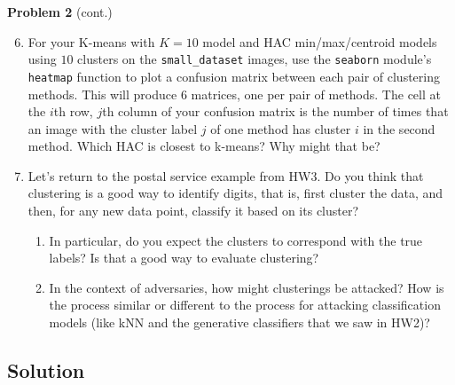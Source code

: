 \documentclass[submit]{harvardml}
\begin{document}
\newpage
\begin{framed}
\noindent\textbf{Problem 2} (cont.)\\
\begin{enumerate}
\setcounter{enumi}{5}
\item For your K-means with $K = 10$ model and HAC min/max/centroid
  models using $10$ clusters on the \texttt{small\_dataset} images,
  use the \texttt{seaborn} module's \texttt{heatmap} function to plot
  a confusion matrix between each pair of clustering methods.  This
  will produce 6 matrices, one per pair of methods. The cell at the
  $i$th row, $j$th column of your confusion matrix is the number of
  times that an image with the cluster label $j$ of one method has
  cluster $i$ in the second method.  Which HAC is closest to k-means?
  Why might that be?


\item Let's return to the postal service example from HW3.  Do you
  think that clustering is a good way to identify digits, that is,
  first cluster the data, and then, for any new data point, classify
  it based on its cluster?
  \begin{enumerate}
\item In particular, do you expect the clusters to correspond with the
  true labels?  Is that a good way to evaluate clustering?
\item In the context of adversaries, how might clusterings be
  attacked?  How is the process similar or different to the process
  for attacking classification models (like kNN and the generative classifiers that we saw in HW2)?
\end{enumerate}
  
\end{enumerate}
\end{framed}


\subsection*{Solution}
\end{document}
